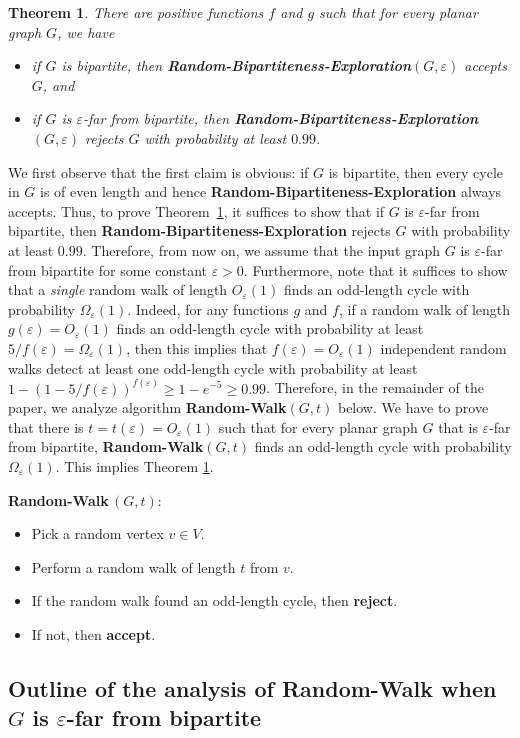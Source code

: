 \documentclass[11pt]{article}
\newtheorem{theorem}{Theorem}
\newcommand{\eps}{\ensuremath{\epsilon}}
\def\epsilon{\ensuremath{\varepsilon}}
\newcommand{\RBE}{{\bf Random-Bipartiteness-Exploration}}
\newcommand{\RW}{{\bf Random-Walk}}
\begin{document}
\begin{theorem}
\label{thm:main-bipartiteness}
There are positive functions $f$ and $g$ such that for every planar graph $G$, we have
\begin{itemize}
\item if $G$ is bipartite, then \RBE$(G,\eps)$ accepts $G$, and
\item if $G$ is $\eps$-far from bipartite, then \RBE$(G,\eps)$ rejects $G$ with probability at least $0.99$.
\end{itemize}
\end{theorem}

We first observe that the first claim is obvious: if $G$ is bipartite, then every cycle in $G$ is of even length and hence \RBE{} always accepts. Thus, to prove Theorem~\ref{thm:main-bipartiteness}, it suffices to show that if $G$ is $\eps$-far from bipartite, then \RBE{} rejects $G$ with probability at least $0.99$. Therefore, from now on, we assume that the input graph $G$ is $\eps$-far from bipartite for some constant $\eps>0$. Furthermore, note that it suffices to show that a \emph{single} random walk of length $O_{\eps}(1)$ finds an odd-length cycle with probability $\Omega_{\eps}(1)$. Indeed, for any functions $g$ and $f$, if a random walk of length $g(\eps) = O_{\eps}(1)$ finds an odd-length cycle with probability at least $5/f(\eps) = \Omega_{\eps}(1)$, then this implies that $f(\eps)=O_{\eps}(1)$ independent random walks detect at least one odd-length cycle with probability at least $1-(1-5/f(\eps))^{f(\eps)} \ge 1-e^{-5} \ge 0.99$. Therefore, in the remainder of the paper, we analyze algorithm \RW$(G,t)$ below. We have to prove that there is $t=t(\eps)=O_{\eps}(1)$ such that for every planar graph $G$ that is $\eps$-far from bipartite, \RW$(G,t)$ finds an odd-length cycle with probability $\Omega_{\eps}(1)$. This implies Theorem \ref{thm:main-bipartiteness}.

\begin{algo}
\RW\,${(G,t)}$:
\begin{itemize}
\item  Pick a random vertex $v \in V$.
\item  Perform a random walk of length $t$ from $v$.
\item  If the random walk found an odd-length cycle, then \textbf{reject}.
\item  If not, then \textbf{accept}.
\end{itemize}
\end{algo}


\subsection{Outline of the analysis of \RW{} when $G$ is $\epsilon$-far from bipartite}
\label{subsec:outline}
\end{document}
